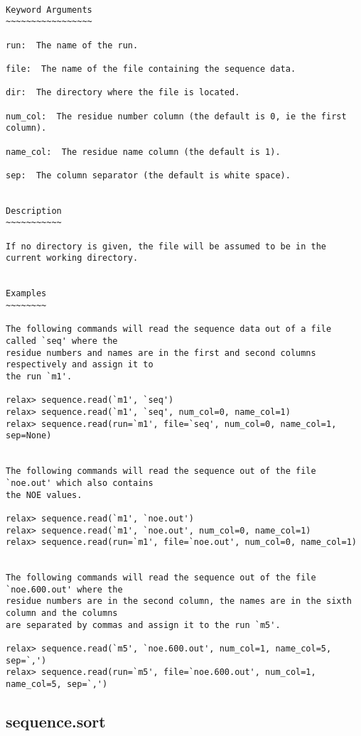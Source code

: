 {\scriptsize
\begin{verbatim}

Keyword Arguments
~~~~~~~~~~~~~~~~~

run:  The name of the run.

file:  The name of the file containing the sequence data.

dir:  The directory where the file is located.

num_col:  The residue number column (the default is 0, ie the first column).

name_col:  The residue name column (the default is 1).

sep:  The column separator (the default is white space).


Description
~~~~~~~~~~~

If no directory is given, the file will be assumed to be in the current working directory.


Examples
~~~~~~~~

The following commands will read the sequence data out of a file called `seq' where the
residue numbers and names are in the first and second columns respectively and assign it to
the run `m1'.

relax> sequence.read(`m1', `seq')
relax> sequence.read(`m1', `seq', num_col=0, name_col=1)
relax> sequence.read(run=`m1', file=`seq', num_col=0, name_col=1, sep=None)


The following commands will read the sequence out of the file `noe.out' which also contains
the NOE values.

relax> sequence.read(`m1', `noe.out')
relax> sequence.read(`m1', `noe.out', num_col=0, name_col=1)
relax> sequence.read(run=`m1', file=`noe.out', num_col=0, name_col=1)


The following commands will read the sequence out of the file `noe.600.out' where the
residue numbers are in the second column, the names are in the sixth column and the columns
are separated by commas and assign it to the run `m5'.

relax> sequence.read(`m5', `noe.600.out', num_col=1, name_col=5, sep=`,')
relax> sequence.read(run=`m5', file=`noe.600.out', num_col=1, name_col=5, sep=`,')
\end{verbatim}
}



\newpage

\subsection{sequence.sort}


